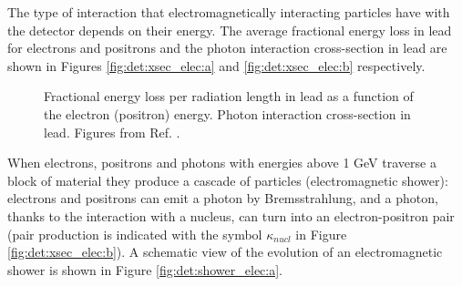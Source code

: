 The type of interaction that electromagnetically interacting particles have with the detector depends on their energy. The average fractional energy loss in lead for electrons and positrons and the photon interaction cross-section in lead are shown in Figures \ref{fig:det:xsec_elec:a} and \ref{fig:det:xsec_elec:b} respectively. 

\begin{figure}[ht]
\centering
{}
\caption{ Fractional energy loss per radiation length in lead as a function of the electron (positron) energy. 
 Photon interaction cross-section in lead. Figures from Ref. \cite{Patrignani:2016xqp}. }
\label{fig:det:xsec_elec}
\end{figure}


When electrons, positrons and photons with energies above 1 GeV traverse a block of material they produce a cascade of particles (electromagnetic shower): electrons and positrons can emit a photon by Bremsstrahlung, and a photon, thanks to the interaction with a nucleus, can turn into an electron-positron pair (pair production is indicated with the symbol $\kappa_{nucl}$ in Figure \ref{fig:det:xsec_elec:b}). A schematic view of the evolution of an electromagnetic shower is shown  in Figure \ref{fig:det:shower_elec:a}. 


